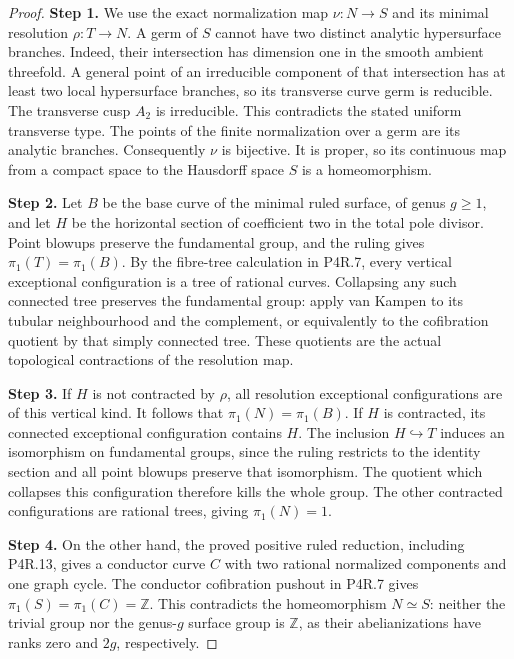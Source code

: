 \begin{proof}
\noindent\textbf{Step 1.} We use the exact normalization map
$\nu:N\longrightarrow S$ and its minimal resolution
$\rho:T\longrightarrow N$. A germ of $S$ cannot have
two distinct analytic hypersurface branches. Indeed,
their intersection has dimension one in the smooth
ambient threefold. A general point of an irreducible
component of that intersection has at least two local
hypersurface branches, so its transverse curve germ is
reducible. The transverse cusp $A_2$ is irreducible.
This contradicts the stated uniform transverse type.
The points of the finite normalization over a germ are
its analytic branches. Consequently $\nu$ is bijective.
It is proper, so its continuous map from a compact space
to the Hausdorff space $S$ is a homeomorphism.

\noindent\textbf{Step 2.} Let $B$ be the base curve of the minimal ruled surface,
of genus $g\ge1$, and let $H$ be the horizontal section
of coefficient two in the total pole divisor. Point
blowups preserve the fundamental group, and the ruling
gives $\pi_1(T)=\pi_1(B)$. By the fibre-tree calculation
in P4R.7, every vertical exceptional configuration is a
tree of rational curves. Collapsing any such connected
tree preserves the fundamental group: apply van Kampen
to its tubular neighbourhood and the complement, or
equivalently to the cofibration quotient by that
simply connected tree. These quotients are the actual
topological contractions of the resolution map.

\noindent\textbf{Step 3.} If $H$ is not contracted by $\rho$, all resolution
exceptional configurations are of this vertical kind.
It follows that $\pi_1(N)=\pi_1(B)$. If $H$ is
contracted, its connected exceptional configuration
contains $H$. The inclusion $H\hookrightarrow T$
induces an isomorphism on fundamental groups, since
the ruling restricts to the identity section and all
point blowups preserve that isomorphism. The quotient
which collapses this configuration therefore kills
the whole group. The other contracted configurations
are rational trees, giving $\pi_1(N)=1$.

\noindent\textbf{Step 4.} On the other hand, the proved positive ruled reduction,
including P4R.13, gives a conductor curve $C$ with two
rational normalized components and one graph cycle.
The conductor cofibration pushout in P4R.7 gives
$\pi_1(S)=\pi_1(C)=\mathbb Z$. This contradicts the
homeomorphism $N\simeq S$: neither the trivial group
nor the genus-$g$ surface group is $\mathbb Z$, as their
abelianizations have ranks zero and $2g$, respectively.
\end{proof}


